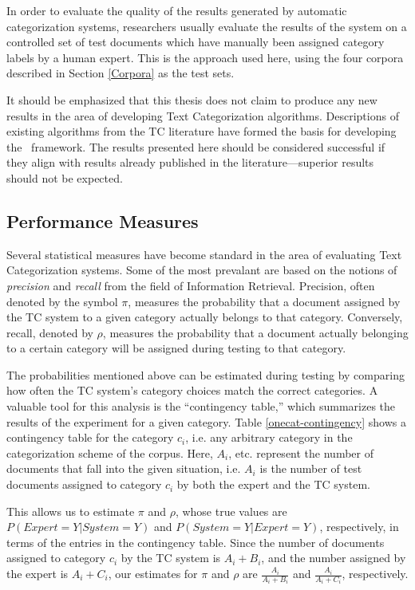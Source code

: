 In order to evaluate the quality of the results generated by automatic
categorization systems, researchers usually evaluate the results of
the system on a controlled set of test documents which have manually
been assigned category labels by a human expert.
\cite[pp. 9 \& 37]{sebastiani:02} This is the approach used here,
using the four corpora described in Section \ref{Corpora} as the test
sets.

It should be emphasized that this thesis does not claim to produce any
new results in the area of developing Text Categorization algorithms.
Descriptions of existing algorithms from the TC literature have formed
the basis for developing the \aicat\ framework.  The results presented
here should be considered successful if they align with results
already published in the literature---superior results should not be
expected.

\subsection{Performance Measures}
\label{measures}

Several statistical measures have become standard in the area of
evaluating Text Categorization systems.\cite[p. 33]{sebastiani:02}
Some of the most prevalant are based on the notions of
\emph{precision} and \emph{recall} from the field of Information
Retrieval.\cite{rijsbergen:79} Precision, often denoted by the symbol
$\pi$, measures the probability that a document assigned by the TC
system to a given category actually belongs to that category.
Conversely, recall, denoted by $\rho$, measures the probability that a
document actually belonging to a certain category will be assigned
during testing to that category.\cite[p. 33]{sebastiani:02}

The probabilities mentioned above can be estimated during testing by
comparing how often the TC system's category choices match the correct
categories.  A valuable tool for this analysis is the ``contingency
table,'' which summarizes the results of the experiment for a given
category.  Table \ref{onecat-contingency} shows a contingency table
for the category $c_i$, i.e. any arbitrary category in the
categorization scheme of the corpus.  Here, $A_i$, etc. represent the
number of documents that fall into the given situation, i.e. $A_i$ is
the number of test documents assigned to category $c_i$ by both the
expert and the TC system.

This allows us to estimate $\pi$ and $\rho$, whose true values are
$P(Expert=Y | System=Y)$ and $P(System=Y | Expert=Y)$, respectively,
in terms of the entries in the contingency table.  Since the number of
documents assigned to category $c_i$ by the TC system is $A_i+B_i$,
and the number assigned by the expert is $A_i+C_i$, our estimates for
$\pi$ and $\rho$ are $\frac{A_i}{A_i + B_i}$ and $\frac{A_i}{A_i +
C_i}$, respectively.



